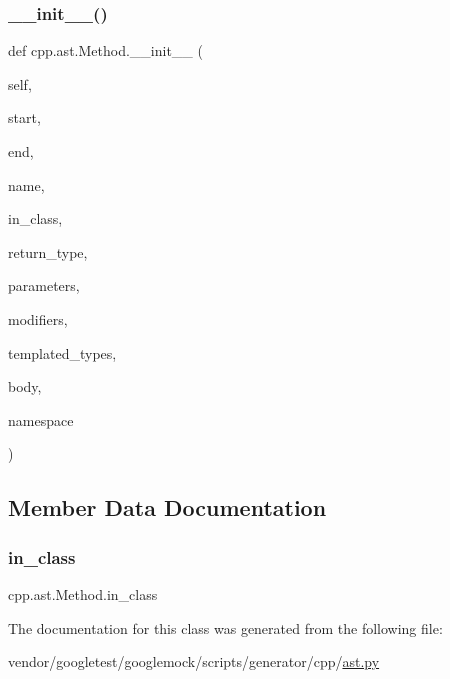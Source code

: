 \subsubsection{\texorpdfstring{\+\_\+\+\_\+init\+\_\+\+\_\+()}{\_\_init\_\_()}}
{\footnotesize\ttfamily def cpp.\+ast.\+Method.\+\_\+\+\_\+init\+\_\+\+\_\+ (\begin{DoxyParamCaption}\item[{}]{self,  }\item[{}]{start,  }\item[{}]{end,  }\item[{}]{name,  }\item[{}]{in\+\_\+class,  }\item[{}]{return\+\_\+type,  }\item[{}]{parameters,  }\item[{}]{modifiers,  }\item[{}]{templated\+\_\+types,  }\item[{}]{body,  }\item[{}]{namespace }\end{DoxyParamCaption})}



\subsection{Member Data Documentation}
\mbox{\label{classcpp_1_1ast_1_1_method_aa67244c3673afed43398b5d3e3fa6c1c}} 
\subsubsection{\texorpdfstring{in\+\_\+class}{in\_class}}
{\footnotesize\ttfamily cpp.\+ast.\+Method.\+in\+\_\+class}



The documentation for this class was generated from the following file\+:\begin{DoxyCompactItemize}
\item 
vendor/googletest/googlemock/scripts/generator/cpp/\hyperlink{ast_8py}{ast.\+py}\end{DoxyCompactItemize}
